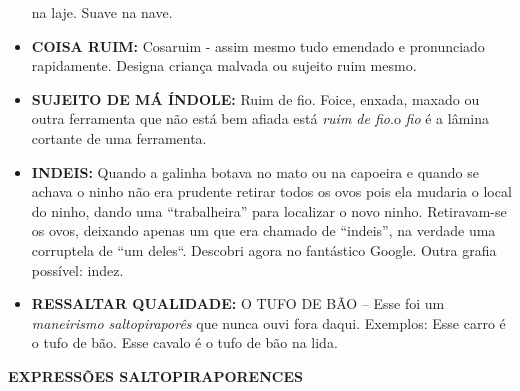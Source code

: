 \documentclass[12pt,brazil,]{book}
\begin{document}
\begin{itemize}
  na laje. Suave na nave.\\
\item
  \textbf{COISA RUIM:} Cosaruim - assim mesmo tudo emendado e
  pronunciado rapidamente. Designa criança malvada ou sujeito ruim
  mesmo.\\
\item
  \textbf{SUJEITO DE MÁ ÍNDOLE:} Ruim de fio. Foice, enxada, maxado ou
  outra ferramenta que não está bem afiada está \emph{ruim de fio}.o
  \emph{fio} é a lâmina cortante de uma ferramenta.\\
\item
  \textbf{INDEIS:} Quando a galinha botava no mato ou na capoeira e
  quando se achava o ninho não era prudente retirar todos os ovos pois
  ela mudaria o local do ninho, dando uma ``trabalheira'' para localizar
  o novo ninho. Retiravam-se os ovos, deixando apenas um que era chamado
  de ``indeis'', na verdade uma corruptela de ``um deles``. Descobri
  agora no fantástico Google. Outra grafia possível: indez.\\
\item
  \textbf{RESSALTAR QUALIDADE:} O TUFO DE BÃO -- Esse foi um
  \emph{maneirismo saltopiraporês} que nunca ouvi fora daqui. Exemplos:
  Esse carro é o tufo de bão. Esse cavalo é o tufo de bão na lida.
\end{itemize}

\textbf{EXPRESSÕES SALTOPIRAPORENCES}
\end{document}
